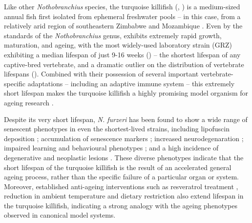 Like other \textit{Nothobranchius} species, the turquoise killifish (\nfu, ) is a medium-sized annual fish first isolated from ephemeral freshwater pools -- in this case, from a relatively arid region of southeastern Zimbabwe and Mozambique \parencite{genade2005annual,jubb1971new}. Even by the standards of the \textit{Nothobranchius} genus, \Nfu exhibits extremely rapid growth, maturation, and ageing, with the most widely-used laboratory strain (GRZ) exhibiting a median lifespan of just 9-16 weeks \parencite{valdesalici2003lifespan,genade2005annual,terzibasi2008strains,kirschner2012map,valenzano2015genome,smith2017microbiota} () -- the shortest lifespan of any captive-bred vertebrate, and a dramatic outlier on the distribution of vertebrate lifespans (). Combined with their possession of several important vertebrate-specific adaptations -- including an adaptive immune system -- this extremely short lifespan makes the turquoise killifish a highly promising model organism for ageing research \parencite{harel2016crispr}.

Despite its very short lifespan, \textit{N. furzeri} has been found to show a wide range of senescent phenotypes in even the shortest-lived strains, including lipofuscin deposition \parencite{genade2005annual};  accumulation of senescence markers \parencite{genade2005annual};  increased neurodegenaration \parencite{valenzano2006resveratrol1,valenzano2006resveratrol2}; impaired learning and behavioural phenotypes  \parencite{genade2005annual,valenzano2006resveratrol1}; and a high incidence of degenerative and neoplastic lesions \parencite{dicicco2011histopathology}. These diverse phenotypes indicate that the short lifespan of the turquoise killifish is the result of an accelerated general ageing process, rather than the specific failure of a particular organ or system. Moreover, established anti-ageing interventions such as resveratrol treatment \parencite{valenzano2006resveratrol1}, reduction in ambient temperature \parencite{valenzano2006temperature} and dietary restriction \parencite{terzibasi2009dr} also extend lifespan in the turquoise killifish, indicating a strong analogy with the ageing phenotypes observed in canonical model systems.

